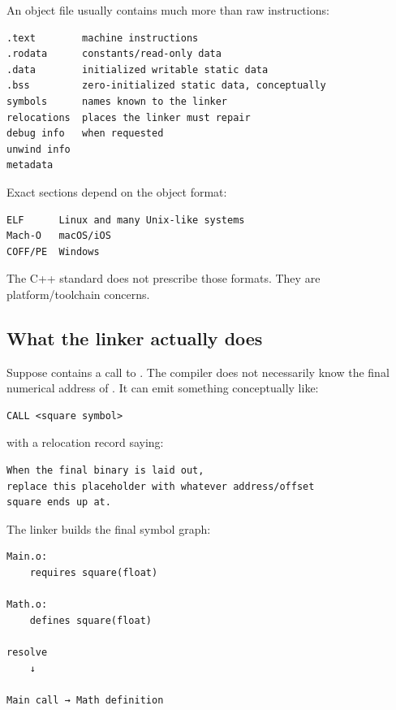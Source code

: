 \hypertarget{05-engine-i-ch002-what-compilation-produces}{}

An object file usually contains much more than raw instructions:

\begin{verbatim}
.text        machine instructions
.rodata      constants/read-only data
.data        initialized writable static data
.bss         zero-initialized static data, conceptually
symbols      names known to the linker
relocations  places the linker must repair
debug info   when requested
unwind info
metadata
\end{verbatim}

Exact sections depend on the object format:

\begin{verbatim}
ELF      Linux and many Unix-like systems
Mach-O   macOS/iOS
COFF/PE  Windows
\end{verbatim}

The C++ standard does not prescribe those formats. They are platform/toolchain concerns.

\subsection{What the linker actually does}\label{05-engine-i-ch002-what-the-linker-actually-does}

\hypertarget{05-engine-i-ch002-what-the-linker-actually-does}{}

Suppose  contains a call to . The compiler does not necessarily know the final numerical address of . It can emit something conceptually like:

\begin{verbatim}
CALL <square symbol>
\end{verbatim}

with a relocation record saying:

\begin{verbatim}
When the final binary is laid out,
replace this placeholder with whatever address/offset
square ends up at.
\end{verbatim}

The linker builds the final symbol graph:

\begin{verbatim}
Main.o:
    requires square(float)

Math.o:
    defines square(float)

resolve
    ↓

Main call → Math definition
\end{verbatim}

